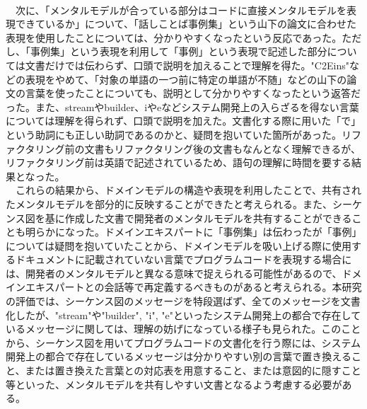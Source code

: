 \documentclass[12pt, a4paper]{jreport}
\begin{document}
\\　次に、「メンタルモデルが合っている部分はコードに直接メンタルモデルを表現できているか」について、「話しことば事例集」という山下の論文に合わせた表現を使用したことについては、分かりやすくなったという反応であった。ただし、「事例集」という表現を利用して「事例」という表現で記述した部分については文書だけでは伝わらず、口頭で説明を加えることで理解を得た。"C2Eins"などの表現をやめて、「対象の単語の一つ前に特定の単語が不随」などの山下の論文の言葉を使ったことについても、説明として分かりやすくなったという返答だった。また、streamやbuilder、iやeなどシステム開発上の入らざるを得ない言葉については理解を得られず、口頭で説明を加えた。文書化する際に用いた「で」という助詞にも正しい助詞であるのかと、疑問を抱いていた箇所があった。リファクタリング前の文書もリファクタリング後の文書もなんとなく理解できるが、リファクタリング前は英語で記述されているため、語句の理解に時間を要する結果となった。
\\　これらの結果から、ドメインモデルの構造や表現を利用したことで、共有されたメンタルモデルを部分的に反映することができたと考えられる。また、シーケンス図を基に作成した文書で開発者のメンタルモデルを共有することができることも明らかになった。ドメインエキスパートに「事例集」は伝わったが「事例」については疑問を抱いていたことから、ドメインモデルを吸い上げる際に使用するドキュメントに記載されていない言葉でプログラムコードを表現する場合には、開発者のメンタルモデルと異なる意味で捉えられる可能性があるので、ドメインエキスパートとの会話等で再定義するべきものがあると考えられる。本研究の評価では、シーケンス図のメッセージを特段選ばず、全てのメッセージを文書化したが、"stream"や"builder", "i", "e"といったシステム開発上の都合で存在しているメッセージに関しては、理解の妨げになっている様子も見られた。このことから、シーケンス図を用いてプログラムコードの文書化を行う際には、システム開発上の都合で存在しているメッセージは分かりやすい別の言葉で置き換えること、または置き換えた言葉との対応表を用意すること、または意図的に隠すこと等といった、メンタルモデルを共有しやすい文書となるよう考慮する必要がある。
\end{document}
